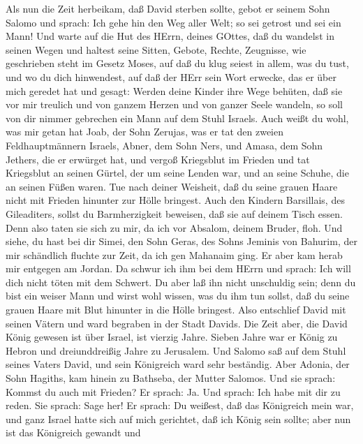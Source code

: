  Als nun die Zeit herbeikam, daß David sterben sollte, gebot
er seinem Sohn Salomo und sprach:  Ich gehe hin den Weg
aller Welt; so sei getrost und sei ein Mann!  Und warte auf
die Hut des HErrn, deines GOttes, daß du wandelst in seinen Wegen und
haltest seine Sitten, Gebote, Rechte, Zeugnisse, wie geschrieben steht
im Gesetz Moses, auf daß du klug seiest in allem, was du tust, und wo du
dich hinwendest,  auf daß der HErr sein Wort erwecke, das er
über mich geredet hat und gesagt: Werden deine Kinder ihre Wege behüten,
daß sie vor mir treulich und von ganzem Herzen und von ganzer Seele
wandeln, so soll von dir nimmer gebrechen ein Mann auf dem Stuhl
Israels.  Auch weißt du wohl, was mir getan hat Joab, der
Sohn Zerujas, was er tat den zweien Feldhauptmännern Israels, Abner, dem
Sohn Ners, und Amasa, dem Sohn Jethers, die er erwürget hat, und vergoß
Kriegsblut im Frieden und tat Kriegsblut an seinen Gürtel, der um seine
Lenden war, und an seine Schuhe, die an seinen Füßen waren. 
Tue nach deiner Weisheit, daß du seine grauen Haare nicht mit Frieden
hinunter zur Hölle bringest.  Auch den Kindern Barsillais,
des Gileaditers, sollst du Barmherzigkeit beweisen, daß sie auf deinem
Tisch essen. Denn also taten sie sich zu mir, da ich vor Absalom, deinem
Bruder, floh.  Und siehe, du hast bei dir Simei, den Sohn
Geras, des Sohns Jeminis von Bahurim, der mir schändlich fluchte zur
Zeit, da ich gen Mahanaim ging. Er aber kam herab mir entgegen am
Jordan. Da schwur ich ihm bei dem HErrn und sprach: Ich will dich nicht
töten mit dem Schwert.  Du aber laß ihn nicht unschuldig
sein; denn du bist ein weiser Mann und wirst wohl wissen, was du ihm tun
sollst, daß du seine grauen Haare mit Blut hinunter in die Hölle
bringest.  Also entschlief David mit seinen Vätern und ward
begraben in der Stadt Davids.  Die Zeit aber, die David
König gewesen ist über Israel, ist vierzig Jahre. Sieben Jahre war er
König zu Hebron und dreiunddreißig Jahre zu Jerusalem.  Und
Salomo saß auf dem Stuhl seines Vaters David, und sein Königreich ward
sehr beständig.  Aber Adonia, der Sohn Hagiths, kam hinein
zu Bathseba, der Mutter Salomos. Und sie sprach: Kommst du auch mit
Frieden? Er sprach: Ja.  Und sprach: Ich habe mit dir zu
reden. Sie sprach: Sage her!  Er sprach: Du weißest, daß
das Königreich mein war, und ganz Israel hatte sich auf mich gerichtet,
daß ich König sein sollte; aber nun ist das Königreich gewandt und
